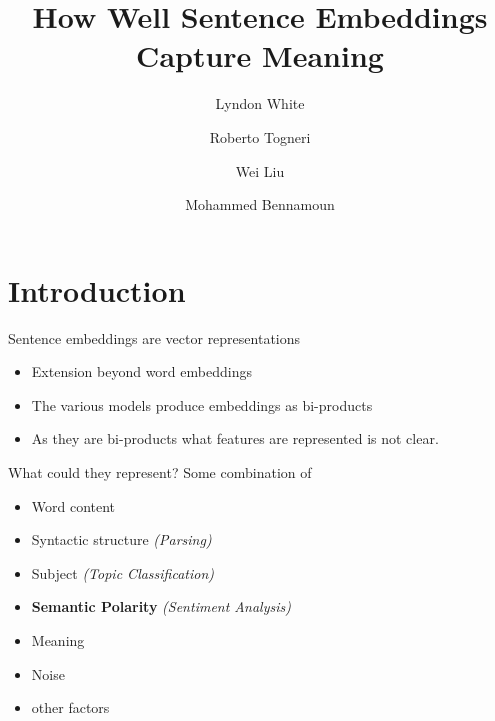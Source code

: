 \documentclass[12pt,landscape,english]{beamer}
\begin{document}

\title[White et al.]{How Well Sentence Embeddings Capture Meaning}
\author[White et al.]{Lyndon White \and Roberto Togneri \and Wei Liu \and Mohammed Bennamoun}
\date{}

\begin{frame}
	\vspace{-0.3\textheight}
	\titlepage
\end{frame}



\section{Introduction}
\begingroup %
\begin{frame}{Sentence embeddings are vector representations}
	\begin{itemize}
		\item Extension beyond word embeddings
		\item The various models produce embeddings as bi-products
		\item As they are bi-products what features are represented is not clear.
	\end{itemize}
	
	
\end{frame}
\endgroup
\begin{frame}{What could they represent?}
	Some combination of
	\begin{itemize}
		\item Word content
		\item Syntactic structure \hfill \emph{(Parsing)}
		\item Subject \hfill \emph{(Topic Classification)}
		\item \textbf{Semantic Polarity} \hfill \emph{(Sentiment Analysis)}
		\item Meaning 
		\item Noise
		\item other factors
	\end{itemize}
\end{frame}
\end{document}
